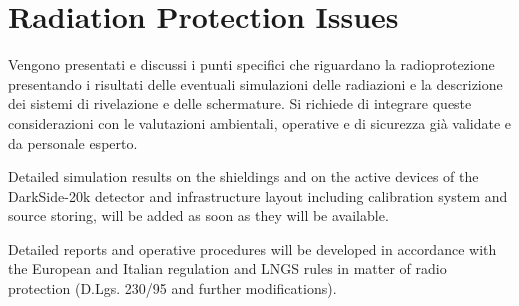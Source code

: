 \section{Radiation Protection Issues}
\label{sec:RadioProtection}

{\bf\color{red}

Vengono presentati e discussi i punti specifici che riguardano la radioprotezione presentando i risultati delle eventuali simulazioni delle radiazioni e la descrizione dei sistemi di rivelazione e delle schermature. Si richiede di integrare queste considerazioni con le valutazioni ambientali, operative e di sicurezza gi\`a validate e da personale esperto.
}
\vspace{1cm}

Detailed simulation results on the shieldings and on the active devices of the DarkSide-20k detector and infrastructure layout including calibration system and source storing, will be added as soon as they will be available.

Detailed reports and operative procedures will be developed in accordance with the European and Italian regulation and LNGS rules in matter of radio protection (D.Lgs. 230/95 and further modifications).

